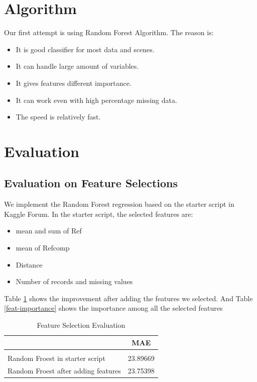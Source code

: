 \documentclass{article} %
\begin{document}
\section{Algorithm}

Our first attempt is using Random Forest Algorithm. The reason is:
\begin{itemize}
\item It is good classifier for most data and scenes.
\item It can handle large amount of variables.
\item It gives features different importance.
\item It can work even with high percentage missing data.
\item The speed is relatively fast.
\end{itemize}

\section{Evaluation}


\subsection{Evaluation on Feature Selections}

We implement the Random Forest regression based on the starter script in Kaggle Forum. In the starter script, the selected features are:

\begin{itemize}
\item mean and sum of Ref
\item mean of Refcomp
\item Distance
\item Number of records and missing values
\end{itemize}

Table \ref{feat-cmp-table} shows the improvement after adding the features we selected. And Table \ref{feat-importance} shows the importance among all the selected features

\begin{table}[h]
\caption{Feature Selection Evaluation}
\label{feat-cmp-table}
\begin{center}
\begin{tabular}{ll}
\multicolumn{1}{c}{}  &\multicolumn{1}{c}{\bf MAE}
\\ \hline \\
Random Froest in starter script             &23.89669 \\
Random Froest after adding features             &23.75398 \\
\end{tabular}
\end{center}
\end{table}
\end{document}
